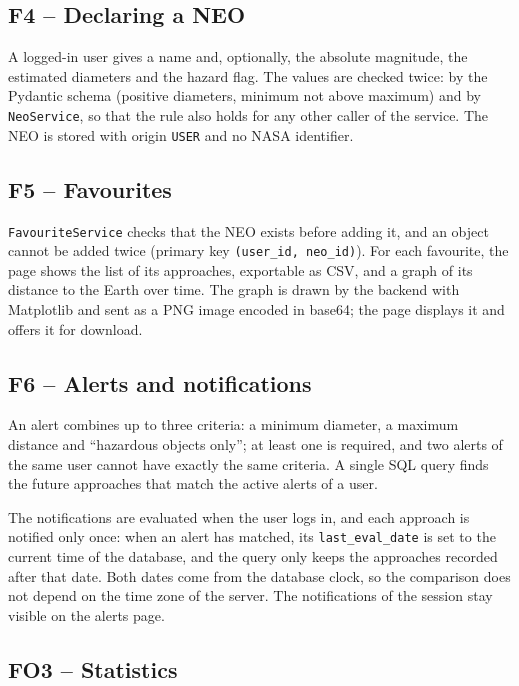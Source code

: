 \subsection{F4 -- Declaring a NEO}

A logged-in user gives a name and, optionally, the absolute magnitude, the estimated diameters
and the hazard flag. The values are checked twice: by the Pydantic schema (positive diameters,
minimum not above maximum) and by \texttt{NeoService}, so that the rule also holds for any other
caller of the service. The NEO is stored with origin \texttt{USER} and no NASA identifier.

\subsection{F5 -- Favourites}

\texttt{FavouriteService} checks that the NEO exists before adding it, and an object cannot be
added twice (primary key \texttt{(user\_id, neo\_id)}). For each favourite, the page shows the
list of its approaches, exportable as CSV, and a graph of its distance to the Earth over time.
The graph is drawn by the backend with Matplotlib and sent as a PNG image encoded in base64; the
page displays it and offers it for download.

\subsection{F6 -- Alerts and notifications}

An alert combines up to three criteria: a minimum diameter, a maximum distance and ``hazardous
objects only''; at least one is required, and two alerts of the same user cannot have exactly the
same criteria. A single SQL query finds the future approaches that match the active alerts of a
user.

The notifications are evaluated when the user logs in, and each approach is notified only once:
when an alert has matched, its \texttt{last\_eval\_date} is set to the current time of the
database, and the query only keeps the approaches recorded after that date. Both dates come from
the database clock, so the comparison does not depend on the time zone of the server. The
notifications of the session stay visible on the alerts page.

\subsection{FO3 -- Statistics}

